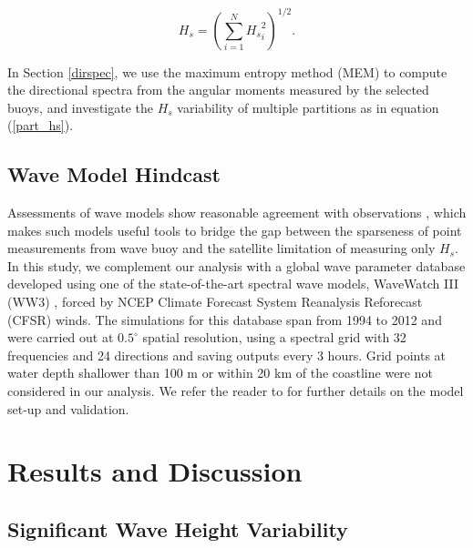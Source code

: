 \begin{equation}
H_s = \left(\sum_{i=1}^N {H_s}^2_i \right)^{1/2}.
\end{equation}

\noindent In Section \ref{dirspec}, we use the maximum entropy method (MEM) \citep{lygre1986maximum} to compute the directional spectra from the angular moments measured by the selected buoys, and investigate the $H_s$ variability of multiple partitions as in equation (\ref{part_hs}). 

\subsection{Wave Model Hindcast}

Assessments of wave models show reasonable agreement with observations \citep{bidlot2002intercomparison,cox2001global}, which makes such models useful tools to bridge the gap between the sparseness of point measurements from wave buoy and the satellite limitation of measuring only $H_s$.  
In this study, we complement our analysis with a global wave parameter database \citep{rascle2013global} developed using one of the state-of-the-art spectral wave models, WaveWatch III (WW3) \citep{tolman2009user}, forced by NCEP Climate Forecast System Reanalysis Reforecast (CFSR) winds. 
The simulations for this database span from 1994 to 2012 and were carried out at $0.5^\circ$ spatial resolution, using a spectral grid with 32 frequencies and 24 directions and saving outputs every 3 hours. Grid points at water depth shallower than 100 m or within 20 km of the coastline were not considered in our analysis. We refer the reader to \cite{rascle2013global} for further details on the model set-up and validation.

\section{Results and Discussion}

\subsection{Significant Wave Height Variability}\label{hsvar}

